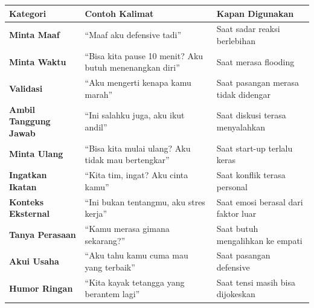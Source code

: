 \begin{center}
\renewcommand{\arraystretch}{1.6}
\begin{tabular}{|>{\raggedright}p{3.5cm}|>{\raggedright}p{5cm}|>{\raggedright\arraybackslash}p{6cm}|}
\hline
\rowcolor{primary!20}
\textbf{Kategori} & \textbf{Contoh Kalimat} & \textbf{Kapan Digunakan} \\
\hline
\textbf{Minta Maaf} & ``Maaf aku defensive tadi'' & Saat sadar reaksi berlebihan \\
\hline
\textbf{Minta Waktu} & ``Bisa kita pause 10 menit? Aku butuh menenangkan diri'' & Saat merasa flooding \\
\hline
\textbf{Validasi} & ``Aku mengerti kenapa kamu marah'' & Saat pasangan merasa tidak didengar \\
\hline
\textbf{Ambil Tanggung Jawab} & ``Ini salahku juga, aku ikut andil'' & Saat diskusi terasa menyalahkan \\
\hline
\textbf{Minta Ulang} & ``Bisa kita mulai ulang? Aku tidak mau bertengkar'' & Saat start-up terlalu keras \\
\hline
\textbf{Ingatkan Ikatan} & ``Kita tim, ingat? Aku cinta kamu'' & Saat konflik terasa personal \\
\hline
\textbf{Konteks Eksternal} & ``Ini bukan tentangmu, aku stres kerja'' & Saat emosi berasal dari faktor luar \\
\hline
\textbf{Tanya Perasaan} & ``Kamu merasa gimana sekarang?'' & Saat butuh mengalihkan ke empati \\
\hline
\textbf{Akui Usaha} & ``Aku tahu kamu cuma mau yang terbaik'' & Saat pasangan defensive \\
\hline
\textbf{Humor Ringan} & ``Kita kayak tetangga yang berantem lagi'' & Saat tensi masih bisa dijokeskan \\
\hline
\end{tabular}
\end{center}

